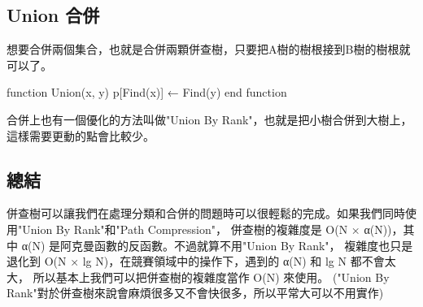 \documentclass{article}
\begin{document}
\subsection{Union 合併}
想要合併兩個集合，也就是合併兩顆併查樹，只要把A樹的樹根接到B樹的樹根就可以了。

\begin{algorithm}[caption={Union}, label={alg1}]
function Union(x, y)
    p[Find(x)] ← Find(y)
end function
\end{algorithm}

合併上也有一個優化的方法叫做"Union By Rank"，也就是把小樹合併到大樹上，這樣需要更動的點會比較少。\\

\subsection{總結}
併查樹可以讓我們在處理分類和合併的問題時可以很輕鬆的完成。如果我們同時使用"Union By Rank"和"Path Compression"，
併查樹的複雜度是 O(N × α(N))，其中 α(N) 是阿克曼函數的反函數。不過就算不用"Union By Rank"，
複雜度也只是退化到 O(N × lg N)，在競賽領域中的操作下，遇到的 α(N) 和 lg N 都不會太大，
所以基本上我們可以把併查樹的複雜度當作 O(N) 來使用。
("Union By Rank"對於併查樹來說會麻煩很多又不會快很多，所以平常大可以不用實作)

\end{document}
